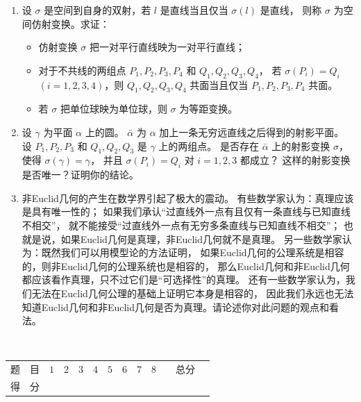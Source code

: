 \begin{enumerate}
\item 设 $\sigma$ 是空间到自身的双射，若 $l$ 是直线当且仅当 $\sigma(l)$ 是直线，
则称 $\sigma$ 为空间仿射变换。求证：
\begin{itemize}
\item[(a)] 仿射变换 $\sigma$ 把一对平行直线映为一对平行直线；
\item[(b)] 对于不共线的两组点 $P_{1}, P_{2}, P_{3}, P_{4}$ 和 $Q_{1}, Q_{2}, Q_{3}, Q_{4}$，
若 $\sigma(P_{i})=Q_{i}$ $(i= 1,2,3,4)$，则 $Q_{1}, Q_{2}, Q_{3}, Q_{4}$ 共面当且仅当 $P_{1}, P_{2}, P_{3}, P_{4}$ 共面。
\item[(c)] 若 $\sigma$ 把单位球映为单位球，则 $\sigma$ 为等距变换。
\end{itemize}
\item 设 $\gamma$ 为平面 $\alpha$ 上的圆。
$\bar{\alpha}$ 为 $\alpha$ 加上一条无穷远直线之后得到的射影平面。
设 $P_{1}, P_{2}, P_{3}$ 和 $Q_{1}, Q_{2}, Q_{3}$ 是 $\gamma$ 上的两组点。
是否存在 $\bar{\alpha}$ 上的射影变换 $\sigma$，使得 $\sigma(\gamma)=\gamma$，
并且 $\sigma(P_{i})=Q_{i}$ 对 $i=1,2,3$ 都成立？
这样的射影变换是否唯一？证明你的结论。
\item 非Euclid几何的产生在数学界引起了极大的震动。
有些数学家认为：真理应该是具有唯一性的；
如果我们承认``过直线外一点有且仅有一条直线与已知直线不相交''，
就不能接受``过直线外一点有无穷多条直线与已知直线不相交''；
也就是说，如果Euclid几何是真理，非Euclid几何就不是真理。
另一些数学家认为：既然我们可以用模型论的方法证明，
如果Euclid几何的公理系统是相容的，则非Euclid几何的公理系统也是相容的，
那么Euclid几何和非Euclid几何都应该看作真理，只不过它们是``可选择性''的真理。
还有一些数学家认为，我们无法在Euclid几何公理的基础上证明它本身是相容的，
因此我们永远也无法知道Euclid几何和非Euclid几何是否为真理。请论述你对此问题的观点和看法。
\end{enumerate}
~\\


\begin{center}


    \begin{table}
    \begin{tabular}{|c|c|c|c|}
        题\ \ 目 &\quad$1$\quad&\quad$2$\quad&\quad$3$\quad&\quad$4$\quad&\quad$5$\quad&\quad$6$\quad&\quad$7$\quad&\quad$8$\quad&\ \ 总分\ \ \\
        得\ \ 分 & & & & & & & & & 
    \end{tabular}
    \end{table}
\end{center}

